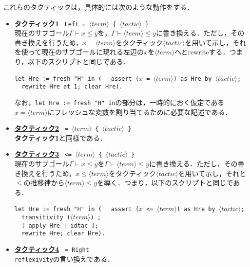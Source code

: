 \documentclass[submit]{ipsj}
\begin{document}
これらのタクティックは，具体的には次のような動作をする．
\begin{itemize}
\item \underline{\gtfamily\bfseries タクティック1}~ \verb+Left = +$\langle\mathit{term}\rangle$\verb+ { +$\langle\mathit{tactic}\rangle$\verb+ }+\\ 現在のサブゴール$\varGamma \vdash x \leq y$を，$\varGamma \vdash \langle\mathit{term}\rangle \leq y$に書き換える．ただし，その書き換えを行うため，$x = \langle\mathit{term}\rangle$をタクティック$\langle\mathit{tactic}\rangle$を用いて示し，それを使って現在のサブゴールに現れる左辺の$x$を$\langle\mathit{term}\rangle$へとrewriteする．つまり，以下のスクリプトと同じである．
\begin{mdframed}[leftmargin=10pt, rightmargin=10pt, skipabove=5pt, skipbelow=15pt]
\verb+let Hre := fresh "H" in (+
\verb+  assert (+$x$\verb+ = +$\langle\mathit{term}\rangle$\verb+) as Hre by +$\langle\mathit{tactic}\rangle$\verb+;+\\
\verb+  rewrite Hre at 1; clear Hre).+
\end{mdframed}
なお，\verb+let Hre := fresh "H" in+の部分は，一時的におく仮定である$x = \langle\mathit{term}\rangle$にフレッシュな変数を割り当てるために必要な記述である．

\item \underline{\gtfamily\bfseries タクティック2}~ \verb+= +$\langle\mathit{term}\rangle$\verb+ { +$\langle\mathit{tactic}\rangle$\verb+ }+ \\ {\gtfamily\bfseries タクティック1}と同様である．

\item \underline{\gtfamily\bfseries タクティック3}~ \verb+<= +$\langle\mathit{term}\rangle$\verb+ { +$\langle\mathit{tactic}\rangle$\verb+ }+\\ 現在のサブゴール$\varGamma \vdash x \leq y$を$\varGamma \vdash \langle\mathit{term}\rangle \leq y$に書き換える．ただし，その書き換えを行うため，$x \leq \langle\mathit{term}\rangle$をタクティック$\langle\mathit{tactic}\rangle$を用いて示し，それと$\leq$の推移律から$\langle\mathit{term}\rangle \leq y$を導く．つまり，以下のスクリプトと同じである．
\begin{mdframed}[leftmargin=10pt, rightmargin=10pt, skipabove=5pt, skipbelow=15pt]
\verb+let Hre := fresh "H" in (+
\verb+  assert (+$x$\verb+ <= +$\langle\mathit{term}\rangle$\verb+) as Hre by +$\langle\mathit{tactic}\rangle$\verb+;+\\
\verb+  transitivity (+$\langle\mathit{term}\rangle$\verb+) ;+\\
\verb+  [ apply Hre | idtac ];+\\
\verb+  rewrite Hre; clear Hre).+
\end{mdframed}

\item \underline{\gtfamily\bfseries タクティック4}~ \verb+= Right+\\\verb+reflexivity+の言い換えである．
\end{itemize}
\end{document}
